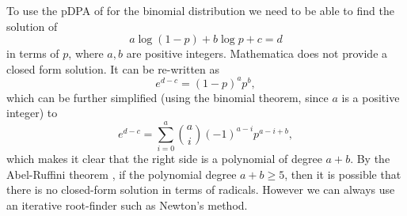 \documentclass[12pt]{article}
\begin{document}
To use the pDPA of \citet{pruned-dp} for the binomial distribution we
need to be able to find the solution of
\begin{equation}
  \label{eq:pDPA-intervals}
  a \log(1-p) + b \log p + c = d
\end{equation}
in terms of $p$, where $a,b$ are positive integers. Mathematica does
not provide a closed form solution. It can be re-written as
\begin{equation}
  \label{eq:pDPA-interval-factorized}
  e^{d-c} = (1-p)^a p^b,
\end{equation}
which can be further simplified (using the binomial theorem, since $a$
is a positive integer) to
\begin{equation}
  \label{eq:pDPA-interval-polynomial}
  e^{d-c} = \sum_{i=0}^a \binom{a}{i} (-1)^{a-i} p^{a-i+b},
\end{equation}
which makes it clear that the right side is a polynomial of degree
$a+b$. By the Abel-Ruffini theorem \citep{Abel-Ruffini-wikipedia}, if
the polynomial degree $a+b\geq 5$, then it is possible that there is
no closed-form solution in terms of radicals. However we can always
use an iterative root-finder such as Newton's method.




\end{document}
